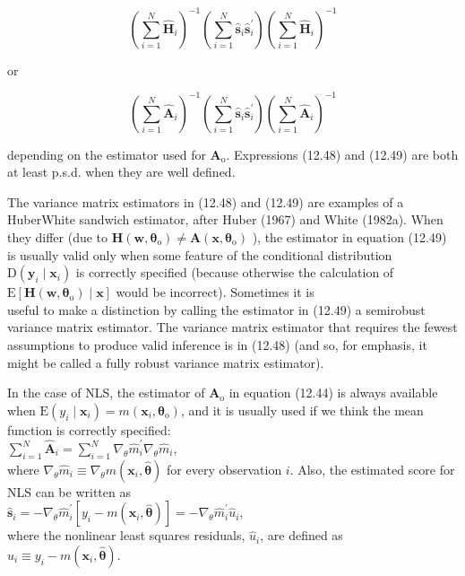 \documentclass[10pt]{article}
\begin{document}
\begin{equation*}
\left(\sum_{i=1}^{N} \hat{\mathbf{H}}_{i}\right)^{-1}\left(\sum_{i=1}^{N} \hat{\mathbf{s}}_{i} \hat{\mathbf{s}}_{i}^{\prime}\right)\left(\sum_{i=1}^{N} \hat{\mathbf{H}}_{i}\right)^{-1} \tag{12.48}
\end{equation*}


or


\begin{equation*}
\left(\sum_{i=1}^{N} \hat{\mathbf{A}}_{i}\right)^{-1}\left(\sum_{i=1}^{N} \hat{\mathbf{s}}_{i} \hat{\mathbf{s}}_{i}^{\prime}\right)\left(\sum_{i=1}^{N} \hat{\mathbf{A}}_{i}\right)^{-1} \tag{12.49}
\end{equation*}


depending on the estimator used for $\mathbf{A}_{\mathrm{o}}$. Expressions (12.48) and (12.49) are both at least p.s.d. when they are well defined.

The variance matrix estimators in (12.48) and (12.49) are examples of a HuberWhite sandwich estimator, after Huber (1967) and White (1982a). When they differ (due to $\mathbf{H}\left(\mathbf{w}, \boldsymbol{\theta}_{\mathrm{o}}\right) \neq \mathbf{A}\left(\mathbf{x}, \boldsymbol{\theta}_{\mathrm{o}}\right)$ ), the estimator in equation (12.49) is usually valid only when some feature of the conditional distribution $\mathrm{D}\left(\mathbf{y}_{i} \mid \mathbf{x}_{i}\right)$ is correctly specified (because otherwise the calculation of $\mathrm{E}\left[\mathbf{H}\left(\mathbf{w}, \boldsymbol{\theta}_{\mathrm{o}}\right) \mid \mathbf{x}\right]$ would be incorrect). Sometimes it is\\
useful to make a distinction by calling the estimator in (12.49) a semirobust variance matrix estimator. The variance matrix estimator that requires the fewest assumptions to produce valid inference is in (12.48) (and so, for emphasis, it might be called a fully robust variance matrix estimator).

In the case of NLS, the estimator of $\mathbf{A}_{\mathrm{o}}$ in equation (12.44) is always available when $\mathrm{E}\left(y_{i} \mid \mathbf{x}_{i}\right)=m\left(\mathbf{x}_{i}, \boldsymbol{\theta}_{\mathrm{o}}\right)$, and it is usually used if we think the mean function is correctly specified:\\
$\sum_{i=1}^{N} \hat{\mathbf{A}}_{i}=\sum_{i=1}^{N} \nabla_{\theta} \hat{m}_{i}^{\prime} \nabla_{\theta} \hat{m}_{i}$,\\
where $\nabla_{\theta} \hat{m}_{i} \equiv \nabla_{\theta} m\left(\mathbf{x}_{i}, \hat{\boldsymbol{\theta}}\right)$ for every observation $i$. Also, the estimated score for NLS can be written as\\
$\hat{\mathbf{s}}_{i}=-\nabla_{\theta} \hat{m}_{i}^{\prime}\left[y_{i}-m\left(\mathbf{x}_{i}, \hat{\boldsymbol{\theta}}\right)\right]=-\nabla_{\theta} \hat{m}_{i}^{\prime} \hat{u}_{i}$,\\
where the nonlinear least squares residuals, $\hat{u}_{i}$, are defined as\\
$\hat{u}_{i} \equiv y_{i}-m\left(\mathbf{x}_{i}, \hat{\boldsymbol{\theta}}\right)$.
\end{document}
